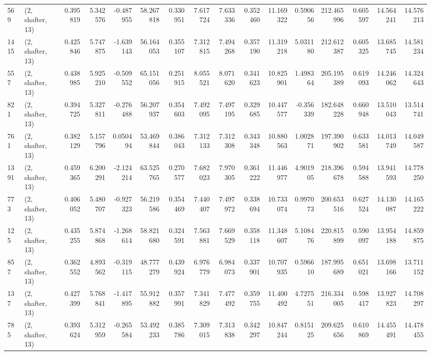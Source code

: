 \begin{tabular}{llrrrrrrrrrrrrrr}
569  &  (2, shafter, 13) &   0.395819 &   5.342576 &  -0.487955 &     58.267818 &    0.330951 &    7.617724 &    7.633336 &  0.352460 &  11.169322 &   0.590656 &   212.465996 &   0.605597 &  14.564241 &  14.576213 \\
1415 &  (2, shafter, 13) &   0.425846 &   5.747875 &  -1.639143 &     56.164053 &    0.355107 &    7.312815 &    7.494268 &  0.357190 &  11.319218 &   5.031180 &   212.612387 &   0.605325 &  13.685745 &  14.581234 \\
557  &  (2, shafter, 13) &   0.438985 &   5.925210 &  -0.509552 &     65.151056 &    0.251915 &    8.055521 &    8.071620 &  0.341623 &  10.825901 &   1.498364 &   205.195389 &   0.619093 &  14.246062 &  14.324643 \\
821  &  (2, shafter, 13) &   0.394725 &   5.327811 &  -0.276488 &     56.207937 &    0.354603 &    7.492095 &    7.497195 &  0.329685 &  10.447577 &  -0.356339 &   182.648228 &   0.660948 &  13.510043 &  13.514741 \\
761  &  (2, shafter, 13) &   0.382129 &   5.157796 &   0.050494 &     53.469844 &    0.386043 &    7.312133 &    7.312308 &  0.343348 &  10.880563 &   1.002871 &   197.390902 &   0.633581 &  14.013749 &  14.049587 \\
1391 &  (2, shafter, 13) &   0.459365 &   6.200291 &  -2.124214 &     63.525765 &    0.270577 &    7.682023 &    7.970305 &  0.361222 &  11.446977 &   4.901905 &   218.396678 &   0.594588 &  13.941593 &  14.778250 \\
773  &  (2, shafter, 13) &   0.406052 &   5.480707 &  -0.927323 &     56.219586 &    0.354469 &    7.440407 &    7.497972 &  0.338694 &  10.733074 &   0.997073 &   200.653516 &   0.627524 &  14.130087 &  14.165222 \\
125  &  (2, shafter, 13) &   0.435255 &   5.874868 &  -1.268614 &     58.821680 &    0.324591 &    7.563881 &    7.669529 &  0.358118 &  11.348607 &   5.108476 &   220.815899 &   0.590097 &  13.954188 &  14.859875 \\
857  &  (2, shafter, 13) &   0.362552 &   4.893562 &  -0.319115 &     48.777279 &    0.439924 &    6.976779 &    6.984073 &  0.337901 &  10.707935 &   0.596610 &   187.995689 &   0.651021 &  13.698166 &  13.711152 \\
137  &  (2, shafter, 13) &   0.427399 &   5.768841 &  -1.417895 &     55.912882 &    0.357991 &    7.341829 &    7.477492 &  0.359755 &  11.400492 &   4.727551 &   216.334005 &   0.598417 &  13.927823 &  14.708297 \\
785  &  (2, shafter, 13) &   0.393624 &   5.312959 &  -0.265584 &     53.492233 &    0.385786 &    7.309015 &    7.313838 &  0.342297 &  10.847244 &   0.815125 &   209.625656 &   0.610869 &  14.455491 &  14.478455 \\

\end{tabular}
